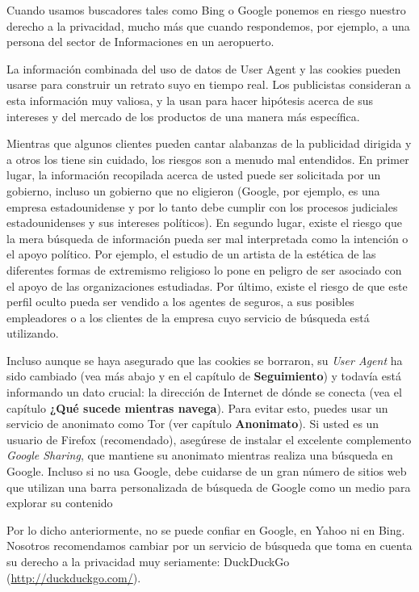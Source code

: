 \documentclass[10pt,a5paper,twoside,,]{book}
\begin{document}
Cuando usamos buscadores tales como Bing o Google ponemos en riesgo
nuestro derecho a la privacidad, mucho más que cuando respondemos, por
ejemplo, a una persona del sector de Informaciones en un aeropuerto.

La información combinada del uso de datos de User Agent y las cookies
pueden usarse para construir un retrato suyo en tiempo real. Los
publicistas consideran a esta información muy valiosa, y la usan para
hacer hipótesis acerca de sus intereses y del mercado de los productos
de una manera más específica.

Mientras que algunos clientes pueden cantar alabanzas de la publicidad
dirigida y a otros los tiene sin cuidado, los riesgos son a menudo mal
entendidos. En primer lugar, la información recopilada acerca de usted
puede ser solicitada por un gobierno, incluso un gobierno que no
eligieron (Google, por ejemplo, es una empresa estadounidense y por lo
tanto debe cumplir con los procesos judiciales estadounidenses y sus
intereses políticos). En segundo lugar, existe el riesgo que la mera
búsqueda de información pueda ser mal interpretada como la intención o
el apoyo político. Por ejemplo, el estudio de un artista de la estética
de las diferentes formas de extremismo religioso lo pone en peligro de
ser asociado con el apoyo de las organizaciones estudiadas. Por último,
existe el riesgo de que este perfil oculto pueda ser vendido a los
agentes de seguros, a sus posibles empleadores o a los clientes de la
empresa cuyo servicio de búsqueda está utilizando.

Incluso aunque se haya asegurado que las cookies se borraron, su
\emph{User Agent} ha sido cambiado (vea más abajo y en el capítulo de
\textbf{Seguimiento}) y todavía está informando un dato crucial: la
dirección de Internet de dónde se conecta (vea el capítulo \textbf{¿Qué
sucede mientras navega}). Para evitar esto, puedes usar un servicio de
anonimato como Tor (ver capítulo \textbf{Anonimato}). Si usted es un
usuario de Firefox (recomendado), asegúrese de instalar el excelente
complemento \emph{Google Sharing}, que mantiene su anonimato mientras
realiza una búsqueda en Google. Incluso si no usa Google, debe cuidarse
de un gran número de sitios web que utilizan una barra personalizada de
búsqueda de Google como un medio para explorar su contenido

Por lo dicho anteriormente, no se puede confiar en Google, en Yahoo ni
en Bing. Nosotros recomendamos cambiar por un servicio de búsqueda que
toma en cuenta su derecho a la privacidad muy seriamente: DuckDuckGo
(\url{http://duckduckgo.com/}).
\end{document}
